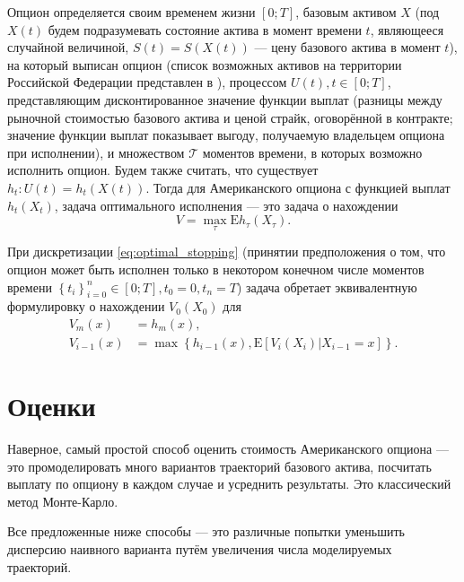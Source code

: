 \documentclass[specialist,
               substylefile = ../spbu.rtx,
               subf,href,colorlinks=true, 12pt]{disser}
\newcommand{\E}{\mathrm{E}}
\newcommand{\Tau}{\ensuremath{\mathcal{T}}}
\begin{document}
Опцион определяется своим временем жизни $[0;T]$, базовым активом $X$ (под $X(t)$ будем подразумевать состояние актива в момент времени $t$, являющееся случайной величиной, $S(t) = S(X(t))$ --- цену базового актива в момент $t$), на который выписан опцион (список возможных активов на территории Российской Федерации представлен в \cite{fsfr}), процессом $U(t), t\in [0;T]$, представляющим дисконтированное значение функции выплат (разницы между рыночной стоимостью базового актива и ценой страйк, оговорённой в контракте; значение функции выплат показывает выгоду, получаемую владельцем опциона при исполнении), и множеством $\Tau$ моментов времени, в которых возможно исполнить опцион. Будем также считать, что существует $h_t: U(t) = h_t\left(X(t)\right)$. Тогда для Американского опциона с функцией выплат $h_t\left(X_t\right)$, задача оптимального исполнения --- это задача о нахождении 
\begin{equation}\label{eq:optimal_stopping}
V = \max_{\tau} \E h_\tau\left(X_\tau\right).
\end{equation}

При дискретизации \eqref{eq:optimal_stopping} (принятии предположения о том, что опцион может быть исполнен только в некотором конечном числе моментов времени $\left\lbrace t_i\right\rbrace_{i=0}^n \in \left[0;T\right], t_0 = 0, t_n = T$) задача обретает эквивалентную формулировку о нахождении $V_0\left(X_0\right)$ для
\begin{equation}\label{eq:option-recursive}\begin{aligned}
			V_m\left(x\right) &= h_m\left(x\right), \\
			V_{i-1}\left(x\right) &= \max\left\lbrace h_{i-1}\left(x\right), \E\left[V_i\left(X_i\right)|X_{i-1}=x\right]\right\rbrace.
\end{aligned}\end{equation}


\section{Оценки} %
\label{sec:estimators}

Наверное, самый простой способ оценить стоимость Американского опциона --- это промоделировать много вариантов траекторий базового актива, посчитать выплату по опциону в каждом случае и усреднить результаты. Это классический метод Монте-Карло.

Все предложенные ниже способы --- это различные попытки уменьшить дисперсию наивного варианта путём увеличения числа моделируемых траекторий. 
\end{document}
